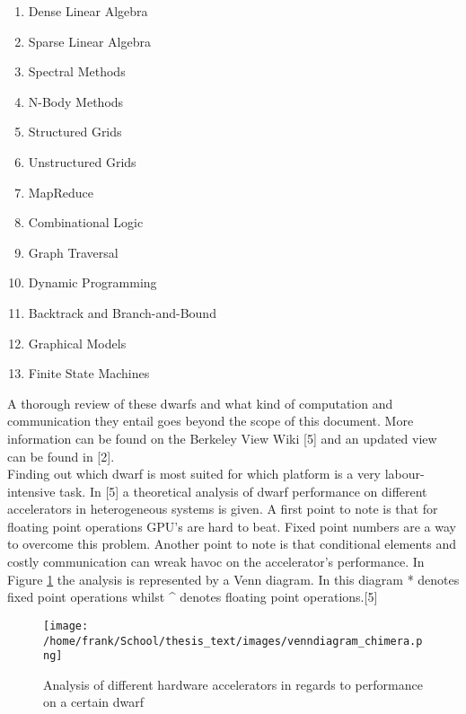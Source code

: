 \begin{multicols}{2}
\begin{enumerate}
\item Dense Linear Algebra
\item Sparse Linear Algebra
\item Spectral Methods
\item N-Body Methods
\item Structured Grids
\item Unstructured Grids
\item MapReduce
\item Combinational Logic
\item Graph Traversal
\item Dynamic Programming
\item Backtrack and Branch-and-Bound
\item Graphical Models
\item Finite State Machines
\end{enumerate}
\end{multicols}

A thorough review of these dwarfs and what kind of computation and communication they entail goes beyond the scope of this document. More information can be found on the Berkeley View Wiki [5] and an updated view can be found in [2].\\
Finding out which dwarf is most suited for which platform is a very labour-intensive task. In [5] a theoretical analysis of dwarf performance on different accelerators in heterogeneous systems is given. A first point to note is that for floating point operations GPU's are hard to beat. Fixed point numbers are a way to overcome this problem. Another point to note is that conditional elements and  costly communication can wreak havoc on the accelerator's performance. In Figure \ref{img:venndiagram_chimera} the analysis is represented by a Venn diagram. In this diagram * denotes fixed point operations whilst \^{} denotes floating point operations.[5]

\begin{figure}[H]
\centering
\texttt{[image: /home/frank/School/thesis\_text/images/venndiagram\_chimera.png]}
\caption{Analysis of different hardware accelerators in regards to performance on a certain dwarf}
\label{img:venndiagram_chimera}
\end{figure}



